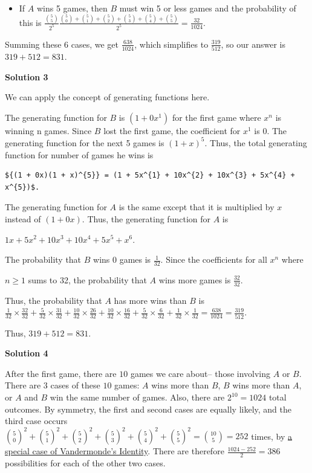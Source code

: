\begin{enumerate}
            \begin{itemize}
        \item If $A$ wins 5 games, then $B$ must win 5 or less games and the probability of this is $\frac{{5 \choose 5}}{2^5} \frac{{5 \choose 0}+{5 \choose 1}+{5 \choose 2}+{5 \choose 3}+{5 \choose 4}+{5 \choose 5}}{2^5} = \frac{32}{1024}$.
            \end{itemize}
            Summing these 6 cases, we get $\frac{638}{1024}$, which simplifies to $\frac{319}{512}$, so our answer is $319 + 512 = \boxed{831}$.

 



\textbf{Solution 3}

We can apply the concept of generating functions here. 

 The generating function for $B$ is $(1 + 0x^{1})$ for the first game where $x^{n}$ is winning n games. Since $B$ lost the first game, the coefficient for $x^{1}$ is 0. The generating function for the next 5 games is $(1 + x)^{5}$. Thus, the total generating function for number of games he wins is

 \begin{verbatim}
${(1 + 0x)(1 + x)^{5}} = (1 + 5x^{1} + 10x^{2} + 10x^{3} + 5x^{4} + x^{5})$.
\end{verbatim}

The generating function for $A$ is the same except that it is multiplied by $x$ instead of $(1+0x)$. Thus, the generating function for $A$ is 

 $1x + 5x^{2} + 10x^{3} + 10x^{4} + 5x^{5} + x^{6}$. 

 The probability that $B$ wins 0 games is $\frac{1}{32}$. Since the coefficients for all $x^{n}$ where 

 $n \geq 1$ sums to 32, the probability that $A$ wins more games is $\frac{32}{32}$. 

 Thus, the probability that $A$ has more wins than $B$ is $\frac{1}{32} \times \frac{32}{32} + \frac{5}{32} \times \frac{31}{32} + \frac{10}{32} \times \frac{26}{32} + \frac{10}{32} \times \frac{16}{32} + \frac{5}{32} \times \frac{6}{32} +\frac{1}{32} \times \frac{1}{32} = \frac{638}{1024} = \frac{319}{512}$.

 Thus, $319 + 512 = \boxed{831}$.

 



\textbf{Solution 4}

After the first game, there are $10$ games we care about-- those involving $A$ or $B$. There are $3$ cases of these $10$ games: $A$ wins more than $B$, $B$ wins more than $A$, or $A$ and $B$ win the same number of games. Also, there are $2^{10} = 1024$ total outcomes. By symmetry, the first and second cases are equally likely, and the third case occurs $\binom{5}{0}^2+\binom{5}{1}^2+\binom{5}{2}^2+\binom{5}{3}^2+\binom{5}{4}^2+\binom{5}{5}^2 = \binom{10}{5} = 252$ times, by \href{https://artofproblemsolving.com/wiki/index.php?title=Combinatorial\_identity\#Another\_Identity}{a special case of Vandermonde's Identity}. There are therefore $\frac{1024-252}{2} = 386$ possibilities for each of the other two cases.


\end{enumerate}
